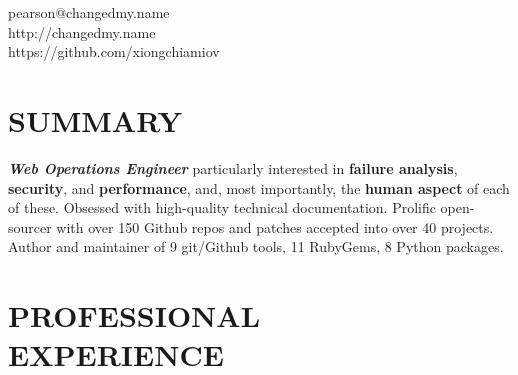 \documentclass[margin,line]{resume}
\begin{document}
{
    \sc
    \hfill pearson@changedmy.name           \vspace{0mm}\\\vspace{0mm}%
    \hfill http://changedmy.name            \vspace{0mm}\\\vspace{0mm}%
    \hfill https://github.com/xiongchiamiov \vspace{0mm}\\\vspace{-9mm}%
}

\begin{resume}

\vspace{6mm}

    \section{\mysidestyle \textbf{\large{S}\small{UMMARY}}}

    \textbf{\textsl{Web Operations Engineer}} particularly interested in \textbf{failure analysis}, \textbf{security}, and \textbf{performance}, and, most importantly, the \textbf{human aspect} of each of these.  Obsessed with high-quality technical documentation.  Prolific open-sourcer with over 150 Github repos and patches accepted into over 40 projects.  Author and maintainer of 9 git/Github tools, 11 RubyGems, 8 Python packages.

\sectionline

    \section{\mysidestyle \textbf{\large{P}\small{ROFESSIONAL\\EXPERIENCE}}}


\end{resume}
\end{document}

